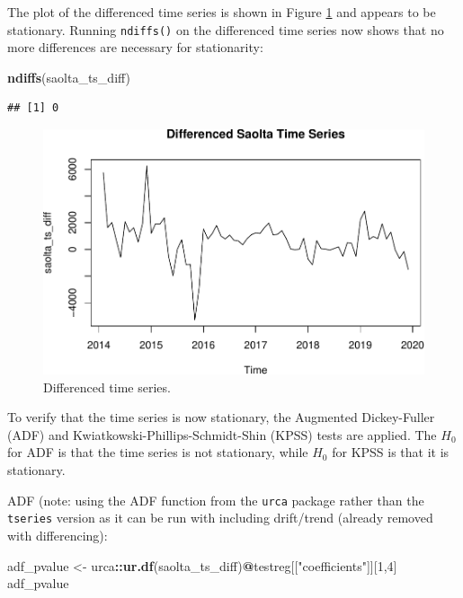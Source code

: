 \documentclass[
  12pt,
]{article}
\newenvironment{Shaded}{\begin{snugshade}}{\end{snugshade}}
\newcommand{\DecValTok}[1]{\textcolor[rgb]{0.00,0.00,0.81}{#1}}
\newcommand{\KeywordTok}[1]{\textcolor[rgb]{0.13,0.29,0.53}{\textbf{#1}}}
\newcommand{\NormalTok}[1]{#1}
\newcommand{\OperatorTok}[1]{\textcolor[rgb]{0.81,0.36,0.00}{\textbf{#1}}}
\newcommand{\StringTok}[1]{\textcolor[rgb]{0.31,0.60,0.02}{#1}}
\begin{document}
\normalsize

\newpage

The plot of the differenced time series is shown in Figure \ref{fig:ts-diffed} and appears to be stationary. Running \texttt{ndiffs()} on the differenced time series now shows that no more differences are necessary for stationarity:
\small

\begin{Shaded}
\begin{Highlighting}[]
\KeywordTok{ndiffs}\NormalTok{(saolta\_ts\_diff)}
\end{Highlighting}
\end{Shaded}

\begin{verbatim}
## [1] 0
\end{verbatim}

\normalsize
\begin{figure}

{\centering \includegraphics[width=0.8\linewidth]{data_science_ca4_files/figure-latex/ts-diffed-1} 

}

\caption{Differenced time series.}\label{fig:ts-diffed}
\end{figure}

To verify that the time series is now stationary, the Augmented Dickey-Fuller (ADF) and Kwiatkowski-Phillips-Schmidt-Shin (KPSS) tests are applied. The \(H_0\) for ADF is that the time series is not stationary, while \(H_0\) for KPSS is that it is stationary.

ADF (note: using the ADF function from the \texttt{urca} package rather than the \texttt{tseries} version as it can be run with including drift/trend (already removed with differencing):
\small

\begin{Shaded}
\begin{Highlighting}[]
\NormalTok{adf\_pvalue \textless{}{-}}\StringTok{ }\NormalTok{urca}\OperatorTok{::}\KeywordTok{ur.df}\NormalTok{(saolta\_ts\_diff)}\OperatorTok{@}\NormalTok{testreg[[}\StringTok{"coefficients"}\NormalTok{]][}\DecValTok{1}\NormalTok{,}\DecValTok{4}\NormalTok{]}
\NormalTok{adf\_pvalue}
\end{Highlighting}
\end{Shaded}
\end{document}

